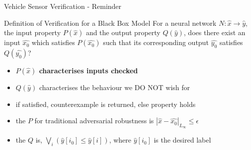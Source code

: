 \documentclass[t,compress,aspectratio=169]{beamer}
\begin{document}
	
\begin{frame}[fragile]{Vehicle Sensor Verification - Reminder}

\begin{alertblock}{Definition of Verification for a Black Box Model}
		For a neural network $N : \hat{x} \rightarrow \hat{y}$, the input property $P(\hat{x})$ and the output property $Q(\hat{y})$, does there exist an input $\hat{x_0}$ which satisfies $P(\hat{x_0})$ such that its corresponding output $\hat{y_0}$ satisfies $Q(\hat{y_0})$?
	\end{alertblock}
		\vspace{0em}
	\begin{itemize}
		
		\item\textcolor{aisecpurple}{ \textbf{$P(\hat{x})$ characterises inputs checked}}
		\item $Q(\hat{y})$ characterises the behaviour we \textcolor{aisecred}{DO NOT} wish for
		\item if satisfied, counterexample is returned, else property holds
		\item the $P$ for traditional adversarial robustness is $|\hat{x} - \hat{x_0}|_{L_{\infty}} \leq \epsilon$
		\item the $Q$ is, $\bigvee_i(\hat{y}[i_0] \leq \hat{y}[i])$, where $\hat{y}[i_0]$ is the desired label
	\end{itemize}
%
%
	\end{frame}
\end{document}
